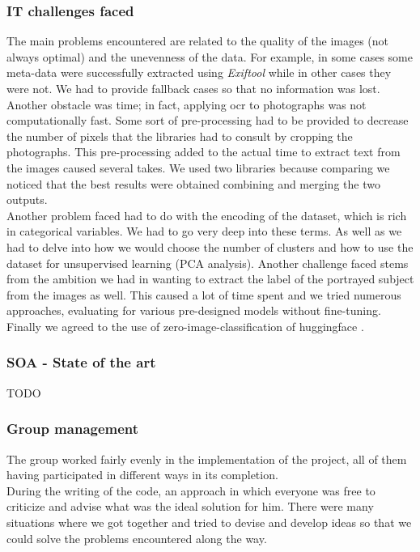 \documentclass[12pt,a4paper,twoside]{article}
\begin{document}
\subsubsection{IT challenges faced}
The main problems encountered are related to the quality of the images (not always optimal) and the unevenness of the data. For example, in some cases some meta-data were successfully extracted using \textit{Exiftool} while in other cases they were not. We had to provide fallback cases so that no information was lost. Another obstacle was time; in fact, applying ocr to photographs was not computationally fast. Some sort of pre-processing had to be provided to decrease the number of pixels that the libraries had to consult by cropping the photographs. This pre-processing added to the actual time to extract text from the images caused several takes. We used two libraries because comparing we noticed that the best results were obtained combining and merging the two outputs. \\ Another problem faced had to do with the encoding of the dataset, which is rich in categorical variables. We had to go very deep into these terms. As well as we had to delve into how we would choose the number of clusters and how to use the dataset for unsupervised learning (PCA analysis). Another challenge faced stems from the ambition we had in wanting to extract the label of the portrayed subject from the images as well. This caused a lot of time spent and we tried numerous approaches, evaluating for various pre-designed models without fine-tuning. Finally we agreed to the use of zero-image-classification of huggingface \cite{huggingface}.

\subsubsection{SOA - State of the art}
TODO

\subsubsection{Group management}
The group worked fairly evenly in the implementation of the project, all of them having 
participated in different ways in its completion.\\ During the writing of the code, an approach in which everyone was free to criticize and advise what was the ideal solution for him. There were many situations where we got together and tried to devise and develop ideas so that we could 
solve the problems encountered along the way.
\end{document}
